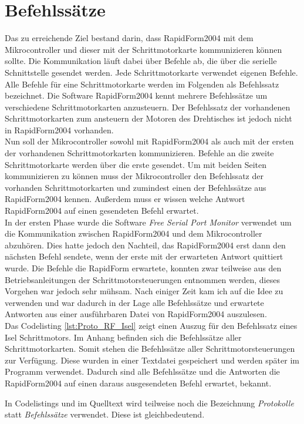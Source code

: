 \section{Befehlssätze} 
\label{sec:Protokolle}
Das zu erreichende Ziel bestand darin, dass RapidForm2004 mit dem Mikrocontroller und dieser mit der Schrittmotorkarte kommunizieren können sollte. Die Kommunikation läuft dabei über Befehle ab, die über die serielle Schnittstelle gesendet werden. 
Jede Schrittmotorkarte verwendet eigenen Befehle. Alle Befehle für eine Schrittmotorkarte werden im Folgenden als Befehlssatz bezeichnet. Die Software RapidForm2004 kennt mehrere Befehlssätze um verschiedene Schrittmotorkarten anzusteuern. Der Befehlssatz der vorhandenen Schrittmotorkarten zum ansteuern der Motoren des Drehtisches ist jedoch nicht in RapidForm2004 vorhanden.\\
Nun soll der Mikrocontroller sowohl mit RapidForm2004 als auch mit der ersten der vorhandenen Schrittmotorkarten kommunizieren. Befehle an die zweite Schrittmotorkarte werden über die erste gesendet. Um mit beiden Seiten kommunizieren zu können muss der Mikrocontroller den Befehlssatz der vorhanden Schrittmotorkarten und zumindest einen der Befehlssätze aus RapidForm2004 kennen. Außerdem muss er wissen welche Antwort RapidForm2004 auf einen gesendeten Befehl erwartet. \\
In der ersten Phase wurde die Software \emph{Free Serial Port Monitor} verwendet um die Kommunikation zwischen RapidForm2004 und dem Mikrocontroller abzuhören. Dies hatte jedoch den Nachteil, das RapidForm2004 erst dann den nächsten Befehl sendete, wenn der erste mit der erwarteten Antwort quittiert wurde. Die Befehle die RapidForm erwartete, konnten zwar teilweise aus den Betriebsanleitungen der Schrittmotorsteuerungen entnommen werden, dieses Vorgehen war jedoch sehr mühsam. Nach einiger Zeit kam ich auf die Idee  zu verwenden und war dadurch in der Lage alle Befehlssätze und erwartete Antworten aus einer ausführbaren Datei von RapidForm2004 auszulesen.\\
Das Codelisting \ref{lst:Proto_RF_Isel} zeigt einen Auszug für den Befehlssatz eines Isel Schrittmotors. Im Anhang befinden sich die Befehlssätze aller Schrittmotorkarten. Somit stehen die Befehlssätze aller Schrittmotorsteuerungen zur Verfügung. Diese wurden in einer Textdatei gespeichert und werden später im Programm verwendet. Dadurch sind alle Befehlssätze und die Antworten die RapidForm2004 auf einen daraus ausgesendeten Befehl erwartet, bekannt.
\begin{Tipp}
In Codelistings und im Quelltext wird teilweise noch die Bezeichnung \emph{Protokolle} statt \emph{Befehlssätze} verwendet. Diese ist gleichbedeutend.
\end{Tipp}
\lstset{language=C, basicstyle=\footnotesize, showstringspaces=false, tabsize=8}


